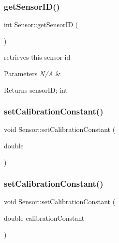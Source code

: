 \subsubsection{\texorpdfstring{get\+Sensor\+I\+D()}{getSensorID()}}
{\footnotesize\ttfamily int Sensor\+::get\+Sensor\+ID (\begin{DoxyParamCaption}{ }\end{DoxyParamCaption})}



retrieves this sensor id 


\begin{DoxyParams}{Parameters}
{\em N/A} & \\
\hline
\end{DoxyParams}
\begin{DoxyReturn}{Returns}
sensor\+ID; int 
\end{DoxyReturn}
\mbox{\label{class_sensor_ad4ef1c3ac7c3ed7427d4337ab3762228}} 
\subsubsection{\texorpdfstring{set\+Calibration\+Constant()}{setCalibrationConstant()}\hspace{0.1cm}{\footnotesize\ttfamily [1/2]}}
{\footnotesize\ttfamily void Sensor\+::set\+Calibration\+Constant (\begin{DoxyParamCaption}\item[{double}]{ }\end{DoxyParamCaption})}

\mbox{\label{class_sensor_ad4ef1c3ac7c3ed7427d4337ab3762228}} 
\subsubsection{\texorpdfstring{set\+Calibration\+Constant()}{setCalibrationConstant()}\hspace{0.1cm}{\footnotesize\ttfamily [2/2]}}
{\footnotesize\ttfamily void Sensor\+::set\+Calibration\+Constant (\begin{DoxyParamCaption}\item[{double}]{calibration\+Constant }\end{DoxyParamCaption})}



